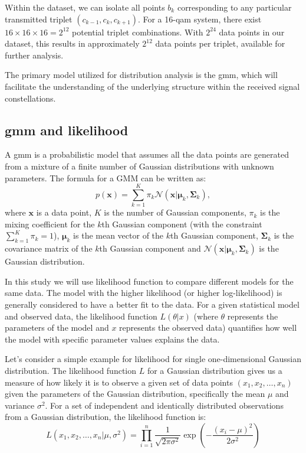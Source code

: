 Within the dataset, we can isolate all points \(b_k\) corresponding to any particular transmitted triplet \((c_{k-1}, c_k, c_{k+1})\). For a 16-\Gls{qam} system, there exist \(16 \times 16 \times 16 = 2^{12}\) potential triplet combinations. With \(2^{24}\) data points in our dataset, this results in approximately \(2^{12}\) data points per triplet, available for further analysis.

The primary model utilized for distribution analysis is the \Gls{gmm}, which will facilitate the understanding of the underlying structure within the received signal constellations.

\subsection{\acrlong{gmm} and likelihood}

A \gls{gmm} is a probabilistic model that assumes all the data points are generated from a mixture of a finite number of Gaussian distributions with unknown parameters. The formula for a GMM can be written as:
\begin{equation}
    p(\mathbf{x}) = \sum_{k=1}^K \pi_k \mathcal{N}(\mathbf{x} | \boldsymbol{\mu}_k, \boldsymbol{\Sigma}_k) {,}
    \label{eq:gmm}
\end{equation}
where \( \mathbf{x} \) is a data point, \( K \) is the number of Gaussian components, \( \pi_k \) is the mixing coefficient for the \(k\)th Gaussian component (with the constraint \( \sum_{k=1}^K \pi_k = 1 \)), \( \boldsymbol{\mu}_k \) is the mean vector of the \(k\)th Gaussian component, \( \boldsymbol{\Sigma}_k \) is the covariance matrix of the \(k\)th Gaussian component and 
\( \mathcal{N}(\mathbf{x} | \boldsymbol{\mu}_k, \boldsymbol{\Sigma}_k) \) is the Gaussian distribution.


In this study we will use likelihood function to compare different models for the same data. The model with the higher likelihood (or higher log-likelihood) is generally considered to have a better fit to the data.
For a given statistical model and observed data, the likelihood function $L(\theta|x)$ (where $\theta$ represents the parameters of the model and $x$ represents the observed data) quantifies how well the model with specific parameter values explains the data.

Let's consider a simple example for likelihood for single one-dimensional Gaussian distribution.
The likelihood function $L$ for a Gaussian distribution gives us a measure of how likely it is to observe a given set of data points $(x_1, x_2, \ldots, x_n)$ given the parameters of the Gaussian distribution, specifically the mean $\mu$ and variance $\sigma^2$.
For a set of independent and identically distributed observations from a Gaussian distribution, the likelihood function is:
\begin{equation}
    L(x_1, x_2, \ldots, x_n | \mu, \sigma^2) = \prod_{i=1}^{n} \frac{1}{\sqrt{2\pi\sigma^2}} \exp\left(-\frac{(x_i - \mu)^2}{2\sigma^2}\right)
\end{equation}

